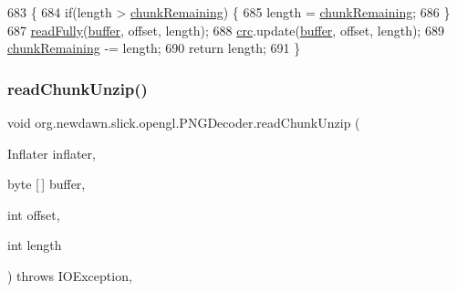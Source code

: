 \begin{DoxyCode}
683                                                                                     \{
684         \textcolor{keywordflow}{if}(length > \mbox{\hyperlink{classorg_1_1newdawn_1_1slick_1_1opengl_1_1_p_n_g_decoder_a7304a0a75ad5821c3f8241a829705b42}{chunkRemaining}}) \{
685             length = \mbox{\hyperlink{classorg_1_1newdawn_1_1slick_1_1opengl_1_1_p_n_g_decoder_a7304a0a75ad5821c3f8241a829705b42}{chunkRemaining}};
686         \}
687         \mbox{\hyperlink{classorg_1_1newdawn_1_1slick_1_1opengl_1_1_p_n_g_decoder_ac1389015c67277f87b9f759e6095f2c0}{readFully}}(\mbox{\hyperlink{classorg_1_1newdawn_1_1slick_1_1opengl_1_1_p_n_g_decoder_ae205f9222586a2bc01a8a240c5c210ad}{buffer}}, offset, length);
688         \mbox{\hyperlink{classorg_1_1newdawn_1_1slick_1_1opengl_1_1_p_n_g_decoder_acd77b774496f8b2d08303022c6227ff1}{crc}}.update(\mbox{\hyperlink{classorg_1_1newdawn_1_1slick_1_1opengl_1_1_p_n_g_decoder_ae205f9222586a2bc01a8a240c5c210ad}{buffer}}, offset, length);
689         \mbox{\hyperlink{classorg_1_1newdawn_1_1slick_1_1opengl_1_1_p_n_g_decoder_a7304a0a75ad5821c3f8241a829705b42}{chunkRemaining}} -= length;
690         \textcolor{keywordflow}{return} length;
691     \}
\end{DoxyCode}
\mbox{\label{classorg_1_1newdawn_1_1slick_1_1opengl_1_1_p_n_g_decoder_a1c0d026f9bcd6134e9847846c8eb393e}} 
\subsubsection{\texorpdfstring{read\+Chunk\+Unzip()}{readChunkUnzip()}}
{\footnotesize\ttfamily void org.\+newdawn.\+slick.\+opengl.\+P\+N\+G\+Decoder.\+read\+Chunk\+Unzip (\begin{DoxyParamCaption}\item[{Inflater}]{inflater,  }\item[{byte \mbox{[}$\,$\mbox{]}}]{buffer,  }\item[{int}]{offset,  }\item[{int}]{length }\end{DoxyParamCaption}) throws I\+O\+Exception\hspace{0.3cm}{\ttfamily [inline]}, {\ttfamily [private]}}


